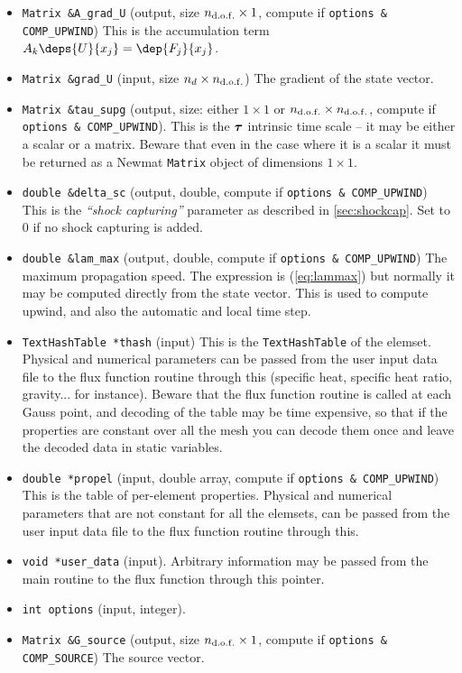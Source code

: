 {\begin{itemize}
\item\verb+Matrix &A_grad_U+ (output, size ${n_{\mathrm{d.o.f.}}}\times 1$, 
compute if \verb+options & COMP_UPWIND+) This is
the accumulation term $A_k \deps{U}{x_j} = \dep{F_j}{x_j}$. 

\item\verb+Matrix &grad_U+ (input, size ${n_d}\times{n_{\mathrm{d.o.f.}}}$) The
gradient of the state vector. 

\item\verb+Matrix &tau_supg+ (output, size: either $1\times1$ or
${n_{\mathrm{d.o.f.}}}\times{n_{\mathrm{d.o.f.}}}$, compute if \verb+options & COMP_UPWIND+). 
This is the $\boldsymbol{\tau}$ intrinsic time scale -- it
may be either a scalar or a matrix. Beware that even in the case where
it is a scalar it must be returned as a Newmat \verb+Matrix+ object of
dimensions $1\times 1$. 

\item\verb+double &delta_sc+ (output, double, compute if
\verb+options & COMP_UPWIND+) 
This is the \emph{``shock capturing''}
parameter as described in \ref{sec:shockcap}. Set to 0 if no shock
capturing is added. 

\item\verb+double &lam_max+ (output, double, compute if
\verb+options & COMP_UPWIND+) 
The maximum propagation
speed. The expression is (\ref{eq:lammax}) but normally it may be
computed directly from the state vector. This is used to compute
upwind, and also the automatic and local time step. 

\item\verb+TextHashTable *thash+ (input) This is the
\verb+TextHashTable+ of the elemset. Physical and numerical parameters
can be passed from the user input data file to the flux function
routine through this (specific heat, specific heat ratio,
gravity... for instance). Beware that the flux function routine is
called at each Gauss point, and decoding of the table may be time
expensive, so that if the properties are constant over all the mesh
you can decode them once and leave the decoded data in static
variables. 

\item\verb+double *propel+ (input, double array, compute if
\verb+options & COMP_UPWIND+) 
This is the table
of per-element properties. Physical and numerical parameters that are
not constant for all the elemsets, can be passed from the user input
data file to the flux function routine through this. 

\item\verb+void *user_data+ (input). Arbitrary information may be
passed from the main routine to the flux function through this
pointer. 

\item\verb+int options+ (input, integer). 

\item\verb+Matrix &G_source+ (output, size ${n_{\mathrm{d.o.f.}}}\times 1$, 
           compute if \verb+options & COMP_SOURCE+) The
           source vector. 
\end{itemize}
}
